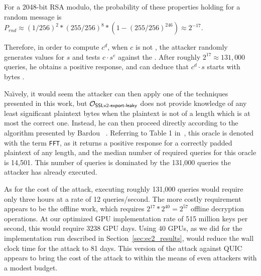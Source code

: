 For a 2048-bit RSA modulo, the probability of these properties holding for a random message is
$P_{rnd} \approx (1/256)^2 * (255/256)^{8} * (1 - (255/256)^{246}) \approx 2^{-17}$.

Therefore, in order to compute $c^d$, when $c$ is not \sslconform,
the attacker randomly generates values for $s$ and tests
$c \cdot s^{e}$ against the \tOracleSSLleaky.
After roughly $2^{17} \approx 131,000$ queries, he obtains a positive response,
and can deduce that $c^d \cdot s$ starts with bytes .

Na\"{\i}vely, it would seem the attacker can then apply one of the techniques
presented in this work, but $\mathcal{O}_\textsf{SSLv2-export-leaky}$ does not provide knowledge of
any least significant plaintext bytes when the plaintext is not of
a length which is at most the correct one.
Instead, he can then proceed directly according to the algorithm presented by
Bardou \etal~\cite{bardou2012efficient}.
Referring to Table 1 in~\cite{bardou2012efficient},
this oracle is denoted with the term \texttt{FFT},
as it returns a positive response for a correctly padded plaintext of any length,
and the median number of required queries for this oracle is 14,501.
This number of queries is dominated by the 131,000 queries the attacker has already executed.

As for the cost of the attack, executing roughly 131,000 queries would require
only three hours at a rate of 12 queries/second.
The more costly requirement appears to be the offline work, which requires
$ 2^{17} * 2^{40} = 2^{57}$ offline decryption operations.
At our optimized GPU implementation rate of 515 million keys per second,
this would require 3238 GPU days.
Using 40 GPUs, as we did for the implementation run described in Section~\ref{sec:ec2_results}, would reduce the wall clock time for the attack to 81 days.
This version of the attack against QUIC appears to bring the cost of the attack
to within the means of even attackers with a modest budget.
\fi

